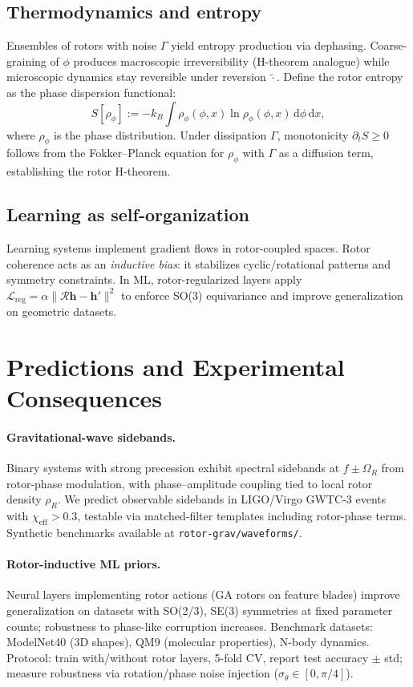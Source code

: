 \documentclass[11pt,a4paper]{article}
\newcommand{\rev}[1]{\widetilde{#1}}           %
\newcommand{\Rotor}{\mathcal{R}}
\theoremstyle{definition}
\theoremstyle{plain}
\theoremstyle{remark}
\begin{document}
\subsection{Thermodynamics and entropy}
Ensembles of rotors with noise $\Gamma$ yield entropy production via dephasing. Coarse-graining of $\phi$ produces macroscopic irreversibility (H-theorem analogue) while microscopic dynamics stay reversible under reversion $\rev{\cdot}$. Define the rotor entropy as the phase dispersion functional:
\begin{equation}
  S[\rho_\phi] := -k_B \int \rho_\phi(\phi,x) \ln \rho_\phi(\phi,x)\, \mathrm{d}\phi\, \mathrm{d}x,
\end{equation}
where $\rho_\phi$ is the phase distribution. Under dissipation $\Gamma$, monotonicity $\partial_t S \geq 0$ follows from the Fokker--Planck equation for $\rho_\phi$ with $\Gamma$ as a diffusion term, establishing the rotor H-theorem.

\subsection{Learning as self-organization}
Learning systems implement gradient flows in rotor-coupled spaces. Rotor coherence acts as an \emph{inductive bias}: it stabilizes cyclic/rotational patterns and symmetry constraints. In ML, rotor-regularized layers apply $\mathcal{L}_{\text{reg}} = \alpha \|\Rotor \mathbf{h} - \mathbf{h}'\|^2$ to enforce SO(3) equivariance and improve generalization on geometric datasets.

\vspace{1em}

\section{Predictions and Experimental Consequences}
\paragraph{Gravitational-wave sidebands.}
Binary systems with strong precession exhibit spectral sidebands at $f\pm \Omega_R$ from rotor-phase modulation, with phase--amplitude coupling tied to local rotor density $\rho_R$. We predict observable sidebands in LIGO/Virgo GWTC-3 events with $\chi_\text{eff} > 0.3$, testable via matched-filter templates including rotor-phase terms. Synthetic benchmarks available at \texttt{rotor-grav/waveforms/}.

\paragraph{Rotor-inductive ML priors.}
Neural layers implementing rotor actions (GA rotors on feature blades) improve generalization on datasets with SO(2/3), SE(3) symmetries at fixed parameter counts; robustness to phase-like corruption increases. Benchmark datasets: ModelNet40 (3D shapes), QM9 (molecular properties), N-body dynamics. Protocol: train with/without rotor layers, 5-fold CV, report test accuracy $\pm$ std; measure robustness via rotation/phase noise injection ($\sigma_\theta \in [0, \pi/4]$).
\end{document}
